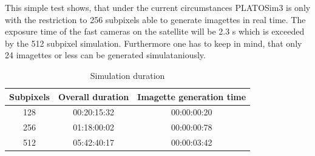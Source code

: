 \newline
This simple test shows, that under the current circumstances PLATOSim3 is only with the restriction to 256 subpixels able to generate imagettes in real time. The exposure time of the fast cameras on the satellite will be 2.3 s which is exceeded by the 512 subpixel simulation. Furthermore one has to keep in mind, that only 24 imagettes or less can be generated simulataniously. 

\begin{table}
	\begin{center}
		\begin{tabular}{ | c | c | c | }
			\hline
			Subpixels & Overall duration & Imagette generation time \\ \hline
			128 & 00:20:15:32 & 00:00:00:20 \\ \hline
			256 & 01:18:00:02 & 00:00:00:78 \\ \hline
			512 & 05:42:40:17 & 00:00:03:42 \\ \hline
		\end{tabular}
		\caption{Simulation duration}
		\label{table:1}
	\end{center}
\end{table}



















